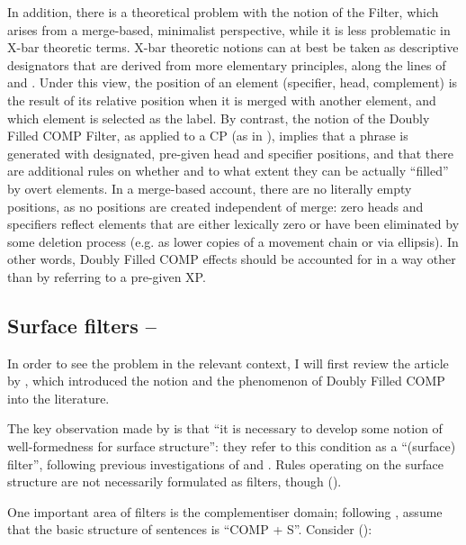In addition, there is a theoretical problem with the notion of the Filter, which arises from a merge-based, minimalist perspective, while it is less problematic in X-bar theoretic terms. X-bar theoretic notions can at best be taken as descriptive designators that are derived from more elementary principles, along the lines of \citet{kayne1994} and \citet{chomsky1995}. Under this view, the position of an element (specifier, head, complement) is the result of its relative position when it is merged with another element, and which element is selected as the label. By contrast, the notion of the Doubly Filled COMP Filter, as applied to a CP (as in \citealt{baltin2010}), implies that a phrase is generated with designated, pre-given head and specifier positions, and that there are additional rules on whether and to what extent they can be actually ``filled'' by overt elements. In a merge-based account, there are no literally empty positions, as no positions are created independent of merge: zero heads and specifiers reflect elements that are either lexically zero or have been eliminated by some deletion process (e.g. as lower copies of a movement chain or via ellipsis). In other words, Doubly Filled COMP effects should be accounted for in a way other than by referring to a pre-given XP.

\subsection{Surface filters -- \citet{chomskylasnik1977}} \label{sec:3chomskylasnik}
In order to see the problem in the relevant context, I will first review the article by \citet{chomskylasnik1977}, which introduced the notion and the phenomenon of Doubly Filled COMP into the literature.

The key observation made by \citet[425]{chomskylasnik1977} is that ``it is necessary to develop some notion of well-formedness for surface structure'': they refer to this condition as a ``(surface) filter'', following previous investigations of \citet{chomsky1965, chomsky1973} and \citet{perlmutter1971}. Rules operating on the surface structure are not necessarily formulated as filters, though (\citealt[426]{chomskylasnik1977}).

One important area of filters is the complementiser domain; following \citet{bresnan1971, bresnan1972diss}, \citet[426]{chomskylasnik1977} assume that the basic structure of sentences is ``COMP + S''. Consider (\citealt[426, ex. 4]{chomskylasnik1977}):

